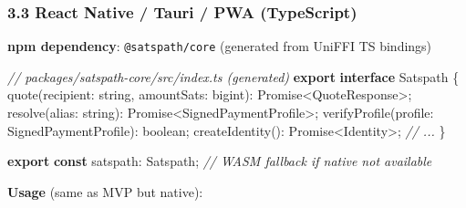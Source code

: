 \documentclass[
]{article}
\newenvironment{Shaded}{}{}
\newcommand{\BuiltInTok}[1]{\textcolor[rgb]{0.00,0.50,0.00}{#1}}
\newcommand{\CommentTok}[1]{\textcolor[rgb]{0.38,0.63,0.69}{\textit{#1}}}
\newcommand{\DataTypeTok}[1]{\textcolor[rgb]{0.56,0.13,0.00}{#1}}
\newcommand{\FunctionTok}[1]{\textcolor[rgb]{0.02,0.16,0.49}{#1}}
\newcommand{\ImportTok}[1]{\textcolor[rgb]{0.00,0.50,0.00}{\textbf{#1}}}
\newcommand{\KeywordTok}[1]{\textcolor[rgb]{0.00,0.44,0.13}{\textbf{#1}}}
\newcommand{\NormalTok}[1]{#1}
\newcommand{\OperatorTok}[1]{\textcolor[rgb]{0.40,0.40,0.40}{#1}}
\begin{document}
\hypertarget{react-native-tauri-pwa-typescript}{%
\subsubsection{3.3 React Native / Tauri / PWA
(TypeScript)}\label{react-native-tauri-pwa-typescript}}

\textbf{npm dependency}: \texttt{@satspath/core} (generated from UniFFI
TS bindings)

\begin{Shaded}
\begin{Highlighting}[]
\CommentTok{// packages/satspath{-}core/src/index.ts (generated)}
\ImportTok{export} \KeywordTok{interface}\NormalTok{ Satspath \{}
  \FunctionTok{quote}\NormalTok{(recipient}\OperatorTok{:} \DataTypeTok{string}\OperatorTok{,}\NormalTok{ amountSats}\OperatorTok{:} \DataTypeTok{bigint}\NormalTok{)}\OperatorTok{:} \BuiltInTok{Promise}\OperatorTok{\textless{}}\NormalTok{QuoteResponse}\OperatorTok{\textgreater{};}
  \FunctionTok{resolve}\NormalTok{(alias}\OperatorTok{:} \DataTypeTok{string}\NormalTok{)}\OperatorTok{:} \BuiltInTok{Promise}\OperatorTok{\textless{}}\NormalTok{SignedPaymentProfile}\OperatorTok{\textgreater{};}
  \FunctionTok{verifyProfile}\NormalTok{(profile}\OperatorTok{:}\NormalTok{ SignedPaymentProfile)}\OperatorTok{:} \DataTypeTok{boolean}\OperatorTok{;}
  \FunctionTok{createIdentity}\NormalTok{()}\OperatorTok{:} \BuiltInTok{Promise}\OperatorTok{\textless{}}\NormalTok{Identity}\OperatorTok{\textgreater{};}
  \CommentTok{// ...}
\NormalTok{\}}

\ImportTok{export} \KeywordTok{const}\NormalTok{ satspath}\OperatorTok{:}\NormalTok{ Satspath}\OperatorTok{;} \CommentTok{// WASM fallback if native not available}
\end{Highlighting}
\end{Shaded}

\textbf{Usage} (same as MVP but native):
\end{document}
